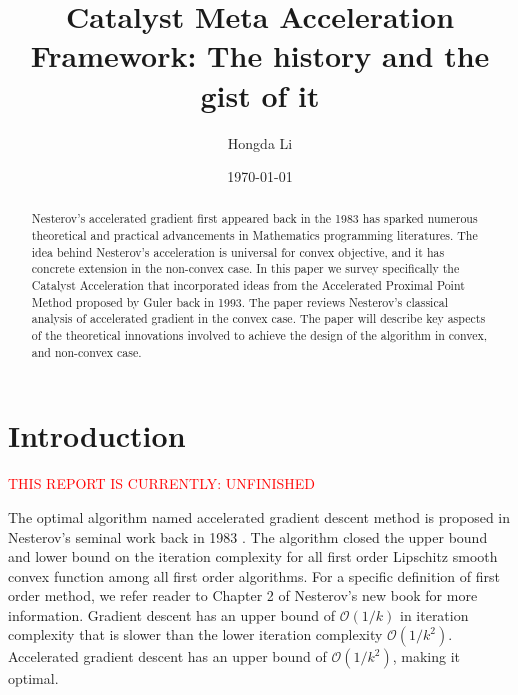 \documentclass[12pt]{article}
\begin{document}
\title{
    {
        \selectfont 
        Catalyst Meta Acceleration Framework: The history and the gist of it
    }
    }

\author{
    Hongda Li
}

\date{\today}

\maketitle


\begin{abstract} 
    \noindent
    Nesterov's accelerated gradient first appeared back in the 1983 has sparked numerous theoretical and practical advancements in Mathematics programming literatures. 
    The idea behind Nesterov's acceleration is universal for convex objective, and it has concrete extension in the non-convex case. 
    In this paper we survey specifically the Catalyst Acceleration that incorporated ideas from the Accelerated Proximal Point Method proposed by Guler back in 1993. 
    The paper reviews Nesterov's classical analysis of accelerated gradient in the convex case.
    The paper will describe key aspects of the theoretical innovations involved to achieve the design of the algorithm in convex, and non-convex case. 
    
\end{abstract}


\section{Introduction}
    \textcolor{red}{THIS REPORT IS CURRENTLY: UNFINISHED}

    The optimal algorithm named accelerated gradient descent method is proposed in Nesterov's seminal work back in 1983 \cite{nesterov_method_1983}. 
    The algorithm closed the upper bound and lower bound on the iteration complexity for all first order Lipschitz smooth convex function among all first order algorithms. 
    For a specific definition of first order method, we refer reader to Chapter 2 of Nesterov's new book \cite{nesterov_lectures_2018} for more information. 
    Gradient descent has an upper bound of $\mathcal O(1/k)$ in iteration complexity that is slower than
    the lower iteration complexity $\mathcal O(1/k^2)$. 
    Accelerated gradient descent has an upper bound of $\mathcal O(1/k^2)$, making it optimal. 
\end{document}
